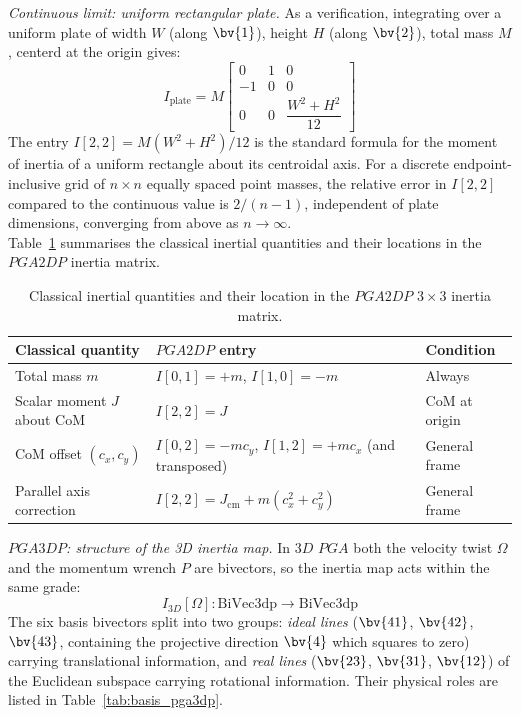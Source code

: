 \emph{Continuous limit: uniform rectangular plate.} As a verification, integrating over a
uniform plate of width $W$ (along $\bv{1}$), height $H$ (along $\bv{2}$), total mass $M$,
centerd at the origin gives:
\begin{equation}
    I_\mathrm{plate} = M
    \begin{bmatrix}
        0  &  1  &  0 \\
        -1 &  0  &  0 \\
        0  &  0  & \dfrac{W^2 + H^2}{12}
    \end{bmatrix}
    \label{eq:inertia_plate}
\end{equation}
The entry $I[2,2] = M(W^2+H^2)/12$ is the standard formula for the moment of inertia of a
uniform rectangle about its centroidal axis. For a discrete endpoint-inclusive grid of $n
\times n$ equally spaced point masses, the relative error in $I[2,2]$ compared to the
continuous value is $2/(n-1)$, independent of plate dimensions, converging from above as
$n \to \infty$. \\

Table~\ref{tab:classical_pga2dp} summarises the classical inertial quantities and their
locations in the $PGA2DP$ inertia matrix.

\begin{table}[h!]
\centering\small
\begin{tabular}{p{4cm}|p{5.5cm}|p{2.8cm}}
\hline
Classical quantity & $PGA2DP$ entry & Condition \\
\hline
Total mass $m$ & $I[0,1] = +m$,\; $I[1,0] = -m$ & Always \\
Scalar moment $J$ about CoM & $I[2,2] = J$ & CoM at origin \\
CoM offset $(c_x, c_y)$ & $I[0,2] = -mc_y$,\; $I[1,2] = +mc_x$ (and transposed) & General
frame \\
Parallel axis correction & $I[2,2] = J_\mathrm{cm} + m(c_x^2 + c_y^2)$ & General frame \\
\hline
\end{tabular}
\caption{Classical inertial quantities and their location in the $PGA2DP$ $3\times3$
inertia matrix.}
\label{tab:classical_pga2dp}
\end{table}

\emph{$PGA3DP$: structure of the 3D inertia map.}
In $3D$ $PGA$ both the velocity twist $\Omega$ and the momentum wrench $P$ are bivectors,
so the inertia map acts within the same grade:
\begin{equation}
    I_{3D}[\Omega] : \mathrm{BiVec3dp} \to \mathrm{BiVec3dp}
\end{equation}
The six basis bivectors split into two groups: \emph{ideal lines} ($\bv{41}$, $\bv{42}$,
$\bv{43}$, containing the projective direction $\bv{4}$ which squares to zero) carrying
translational information, and \emph{real lines} ($\bv{23}$, $\bv{31}$, $\bv{12}$) of the
Euclidean subspace carrying rotational information. Their physical roles are listed in
Table~\ref{tab:basis_pga3dp}.

